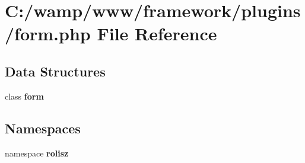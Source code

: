 \section{C:/wamp/www/framework/plugins/form.php File Reference}
\label{form_8php}
\subsection*{Data Structures}
\begin{DoxyCompactItemize}
\item 
class {\bf form}
\end{DoxyCompactItemize}
\subsection*{Namespaces}
\begin{DoxyCompactItemize}
\item 
namespace {\bf rolisz}
\end{DoxyCompactItemize}
